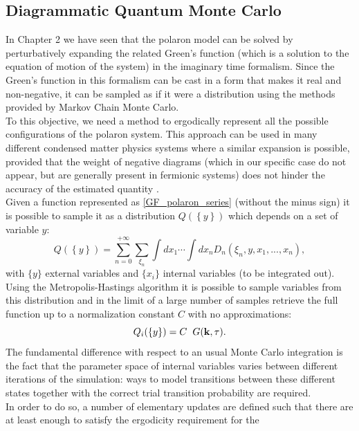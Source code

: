 \subsection{Diagrammatic Quantum Monte Carlo}
In Chapter 2 we have seen that the polaron model can be solved by perturbatively expanding the related Green's function (which is a 
solution to the equation of motion of the system) in the imaginary time formalism. Since the Green's function in this formalism can be cast 
in a form that makes it real and non-negative, it can be sampled as if it were a distribution using the methods provided by Markov Chain Monte Carlo.\\
To this objective, we need a method to ergodically represent all the possible configurations of the polaron system. This approach can be used in many different condensed 
matter physics systems where a similar expansion is possible, provided that the weight of negative diagrams (which in our specific case do not appear, but are generally present in fermionic 
systems) does not hinder the accuracy of the estimated quantity \cite{gull2011continuous}.\\
Given a function represented as \ref{GF_polaron_series} (without the minus sign) it is possible to sample it as a distribution $Q(\left\{y\right\})$ 
which depends on a set of variable $y$:
\begin{equation}
    Q(\left\{y\right\})=\sum_{n=0}^{+\infty}\sum_{\xi_n}\int dx_1 \cdots \int dx_n D_n(\xi_n,{y},x_1,...,x_n),
\end{equation}
with $\{y\}$ external variables and $\{x_i\}$ internal variables (to be integrated out).\\
Using the Metropolis-Hastings algorithm it is possible to sample variables from this distribution and in the limit of a large number of 
samples retrieve the full function up to a normalization constant $C$ with no approximations:
\begin{equation}
    Q_i(\{y\})=C\hspace{0.2cm} G(\mathbf{k},\tau).
\end{equation}
The fundamental difference with respect to an usual Monte Carlo integration is the fact that the parameter space of internal variables 
varies between different iterations of the simulation: ways to model transitions between these different states together with the correct trial transition probability 
are required.\\
In order to do so, a number of elementary updates are defined such that there are at least enough to satisfy the ergodicity requirement \cite{gubernatis2016quantum} for the 

